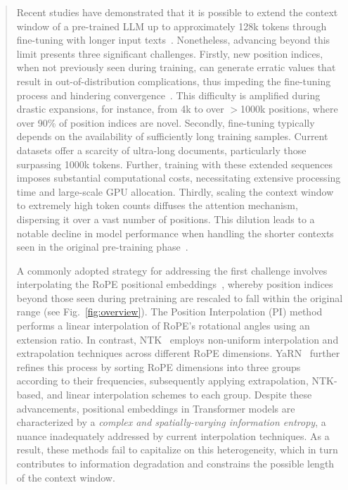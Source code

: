 \begin{abstract}
Recent studies have demonstrated that it is possible to extend the context window of a pre-trained LLM up to approximately 128k tokens through fine-tuning with longer input texts~\cite{longlora,pi,yarn,zhang2024soaring,liu2023scaling}. Nonetheless, advancing beyond this limit presents three significant challenges. Firstly, new position indices, when not previously seen during training, can generate erratic values that result in out-of-distribution complications, thus impeding the fine-tuning process and hindering convergence~\cite{pi}. This difficulty is amplified during drastic expansions, for instance, from 4k to over $>$1000k positions, where over 90\% of position indices are novel. Secondly, fine-tuning typically depends on the availability of sufficiently long training samples. Current datasets offer a scarcity of ultra-long documents, particularly those surpassing 1000k tokens. Further, training with these extended sequences imposes substantial computational costs, necessitating extensive processing time and large-scale GPU allocation. Thirdly, scaling the context window to extremely high token counts diffuses the attention mechanism, dispersing it over a vast number of positions. This dilution leads to a notable decline in model performance when handling the shorter contexts seen in the original pre-training phase~\cite{pi}.

A commonly adopted strategy for addressing the first challenge involves interpolating the RoPE positional embeddings~\cite{rope,pi}, whereby position indices beyond those seen during pretraining are rescaled to fall within the original range (see Fig.~\ref{fig:overview}). The Position Interpolation (PI) method~\cite{pi} performs a linear interpolation of RoPE's rotational angles using an extension ratio. In contrast, NTK~\cite{ntk,dynamicntk} employs non-uniform interpolation and extrapolation techniques across different RoPE dimensions. YaRN~\cite{yarn} further refines this process by sorting RoPE dimensions into three groups according to their frequencies, subsequently applying extrapolation, NTK-based, and linear interpolation schemes to each group. Despite these advancements, positional embeddings in Transformer models are characterized by a \emph{complex and spatially-varying information entropy}, a nuance inadequately addressed by current interpolation techniques. As a result, these methods fail to capitalize on this heterogeneity, which in turn contributes to information degradation and constrains the possible length of the context window.


\end{abstract}
